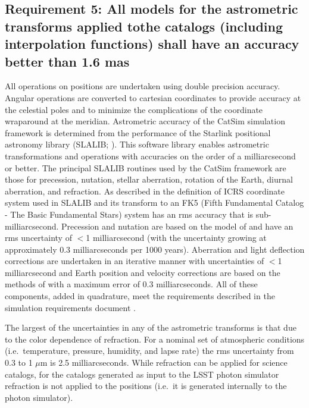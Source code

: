 \documentclass[]{article}
\begin{document}
{\subsection{Requirement 5: All models for the astrometric transforms applied tothe catalogs (including interpolation functions) 
shall have an accuracy better than 1.6 mas}
All operations on positions are undertaken using double precision accuracy. Angular operations are converted to cartesian coordinates to provide accuracy at the celestial poles and to minimize the complications of the coordinate wraparound at the meridian. Astrometric accuracy of the CatSim simulation framework is determined from the performance of the Starlink positional astronomy library (SLALIB; \citet{wallace}). This software library enables astrometric transformations and operations with
accuracies on the order of a milliarcsecond or better.  The principal SLALIB routines used by the CatSim framework are those for precession, nutation, stellar aberration, rotation of the Earth, diurnal aberration, and refraction.  As described in \citet{wallace} the definition of ICRS coordinate system used in SLALIB and its transform to an FK5 (Fifth Fundamental Catalog - The Basic Fundamental Stars) system has an rms accuracy that is sub-milliarcsecond. Precession and nutation are based on the
model of \citet{SF2001} and have an rms uncertainty of $<$1 milliarcsecond (with the uncertainty growing at approximately 0.3 milliarcseconds per 1000 years). Aberration and light deflection corrections are undertaken in an iterative manner with uncertainties of $<$1 milliarcsecond and Earth position and velocity corrections are based on the methods of \citep{stumpff} with a maximum error of 0.3 milliarcseconds. All of these components, added in quadrature, meet the requirements described
in the simulation requirements document \citet{requirements}.

The largest of the uncertainties in any of the astrometric transforms is that due to the color dependence of refraction. For a nominal set of atmospheric conditions (i.e.\ temperature, pressure, humidity, and lapse rate) the rms uncertainty from 0.3 to 1 $\mu$m is 2.5 milliarcseconds. While refraction can be applied for science catalogs, for the catalogs generated as input to the LSST photon simulator refraction is not applied to the positions (i.e.\ it is generated internally to the photon
simulator).
}
\end{document}
